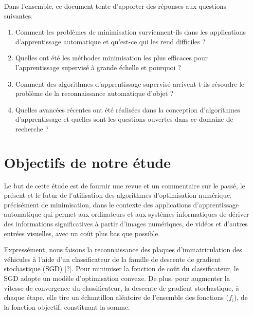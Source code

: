 		Dans l'ensemble, ce document tente d'apporter des réponses aux questions suivantes.
		\begin{enumerate}
			\item Comment les problèmes de minimisation surviennent-ils dans les applications d'apprentissage automatique et qu'est-ce qui les rend difficiles ?
			\item Quelles ont été les méthodes minimisation les plus efficaces pour l'apprentissage supervisé à grande échelle et pourquoi ?
			\item Comment des algorithmes d'apprentissage supervisé arrivent-t-ils résoudre le problème de la reconnaissance automatique d'objet ?
			\item Quelles avancées récentes ont été réalisées dans la conception d'algorithmes d'apprentissage et quelles sont les questions ouvertes dans ce domaine de recherche ?
		\end{enumerate}
			
	
	\section{Objectifs de notre étude}
		
		Le but de cette étude est de fournir une revue et un commentaire sur le passé, le présent et le futur de l'utilisation des algorithmes d'optimisation numérique, précisément de minimisation, dans le contexte des applications d'apprentissage automatique qui permet aux ordinateurs et aux systèmes informatiques de dériver des informations significatives à partir d'images numériques, de vidéos et d'autres entrées visuelles, avec un coût plus bas que possible. 
		
		Expressément, nous faisons la reconnaissance des plaques d’immatriculation des véhicules à l'aide d’un classificateur de la famille de descente de gradient stochastique (SGD) [?]. Pour minimiser la fonction de coût du classificateur, le SGD adopte un modèle d'optimisation convexe. De plus, pour augmenter la vitesse de convergence du classificateur, la descente de gradient stochastique, à chaque étape, elle tire un échantillon aléatoire de l'ensemble des fonctions ($f_i$), de la fonction objectif, constituant la somme.
		
